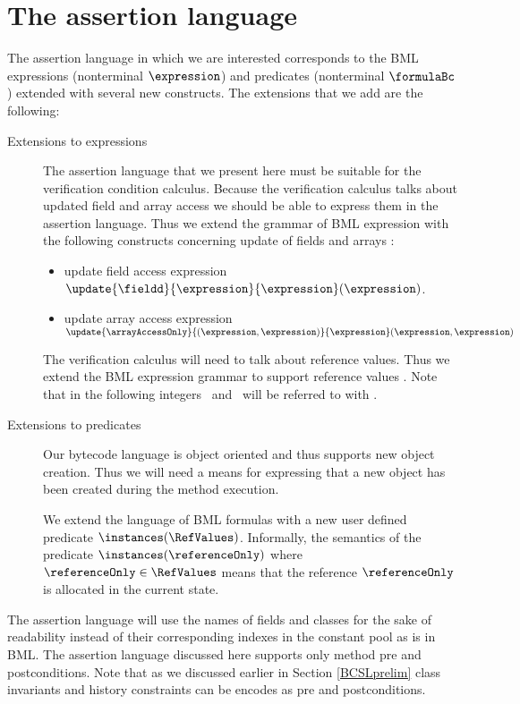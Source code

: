 \section{The assertion language} \label{assertLang:lang}
The assertion language in which we are interested corresponds to the
BML  expressions (nonterminal $\expression$) and predicates 
(nonterminal $\formulaBc$) extended with several new constructs.
 The extensions that we add are the following:
\begin{description}
    \item [Extensions to expressions] 
         The assertion language that we present here must be suitable for the verification condition calculus.
	 Because the verification calculus talks about updated field and array access
	 we should be able  to express  them in the assertion language. Thus we extend the grammar of BML expression
	 with the following constructs concerning update of fields and arrays :

        \begin{itemize}
	       \item update field access expression 
		  $\update{\fieldd}{ \expression}{\expression}(\expression)$.

	       \item update array access expression 
                   $ \update{ \arrayAccessOnly}{ (\expression , \expression)}{ \expression} (\expression,\expression)$
	\end{itemize}

	The verification calculus will need to talk about reference values. Thus we extend the BML expression grammar to  support
	reference values \RefValues. Note that in the following integers \Myint\  and \RefValues \ will be referred to with \Values.
    \item [Extensions to predicates] Our bytecode language is object oriented and thus supports new object creation. Thus we
          will need a means for expressing that a new object has been created during the method execution. 

	  We extend the language of BML  formulas
	  with a new user defined predicate $ \instances(\RefValues)$. Informally, the semantics of the predicate
	  $\instances(\referenceOnly)$ where $\referenceOnly \in \RefValues$
	  means that the reference $\referenceOnly  $  is allocated in the current state.
        
\end{description}

The assertion language will use the names of fields and classes for the sake of readability instead of their corresponding indexes
in the constant pool as is in BML. 
The assertion language discussed here supports only method pre and postconditions. Note that as we discussed earlier in 
Section \ref{BCSLprelim}
class invariants and history constraints can be encodes as pre and postconditions. 
